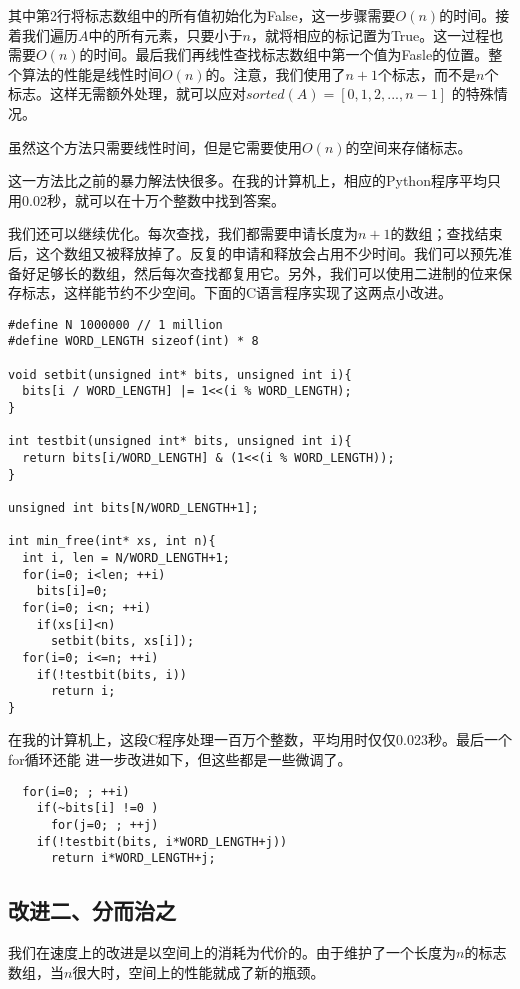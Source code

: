 \documentclass[UTF8]{article}
\begin{document}
其中第2行将标志数组中的所有值初始化为False，这一步骤需要$O(n)$的时间。接着我们遍历$A$中的所有元素，只要小于$n$，就将相应的标记置为True。这一过程也需要$O(n)$的时间。最后我们再线性查找标志数组中第一个值为Fasle的位置。整个算法的性能是线性时间$O(n)$的。注意，我们使用了$n+1$个标志，而不是$n$个标志。这样无需额外处理，就可以应对$sorted(A) = [0, 1, 2, ..., n-1]$
的特殊情况。

虽然这个方法只需要线性时间，但是它需要使用$O(n)$的空间来存储标志。

这一方法比之前的暴力解法快很多。在我的计算机上，相应的Python程序平均只用0.02秒，就可以在十万个整数中找到答案。

我们还可以继续优化。每次查找，我们都需要申请长度为$n+1$的数组；查找结束后，这个数组又被释放掉了。反复的申请和释放会占用不少时间。我们可以预先准备好足够长的数组，然后每次查找都复用它。另外，我们可以使用二进制的位来保存标志，这样能节约不少空间。下面的C语言程序实现了这两点小改进。

\lstset{language = C}
\begin{lstlisting}
#define N 1000000 // 1 million
#define WORD_LENGTH sizeof(int) * 8

void setbit(unsigned int* bits, unsigned int i){
  bits[i / WORD_LENGTH] |= 1<<(i % WORD_LENGTH);
}

int testbit(unsigned int* bits, unsigned int i){
  return bits[i/WORD_LENGTH] & (1<<(i % WORD_LENGTH));
}

unsigned int bits[N/WORD_LENGTH+1];

int min_free(int* xs, int n){
  int i, len = N/WORD_LENGTH+1;
  for(i=0; i<len; ++i)
    bits[i]=0;
  for(i=0; i<n; ++i)
    if(xs[i]<n)
      setbit(bits, xs[i]);
  for(i=0; i<=n; ++i)
    if(!testbit(bits, i))
      return i;
}
\end{lstlisting}

在我的计算机上，这段C程序处理一百万个整数，平均用时仅仅0.023秒。最后一个for循环还能
进一步改进如下，但这些都是一些微调了。

\begin{lstlisting}
  for(i=0; ; ++i)
    if(~bits[i] !=0 )
      for(j=0; ; ++j)
	if(!testbit(bits, i*WORD_LENGTH+j))
	  return i*WORD_LENGTH+j;
\end{lstlisting}

\subsection{改进二、分而治之}
我们在速度上的改进是以空间上的消耗为代价的。由于维护了一个长度为$n$的标志数组，当$n$很大时，空间上的性能就成了新的瓶颈。
\end{document}
